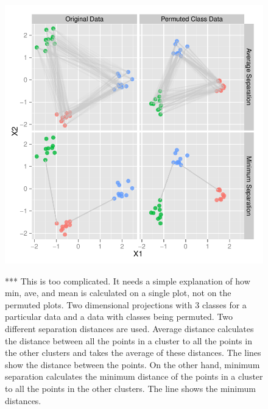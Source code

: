 \documentclass[12]{article}
\newcommand{\red}[1]{{\color{red} #1}}
\begin{document}
\begin{figure}[hbtp]
\centering
\includegraphics[scale=0.75]{ave-min-sep.pdf}
\label{sep-dist}
	\vspace{-.1in}
\caption{\red{*** This is too complicated. It needs a simple explanation of how min, ave, and mean is calculated on a single plot, not on the permuted plots.} Two dimensional projections with 3 classes for a particular data and a data with classes being permuted. Two different separation distances are used. Average distance calculates the distance between all the points in a cluster to all the points in the other clusters and takes the average of these distances. The lines show the distance between the points.  On the other hand,  minimum separation calculates the minimum distance of the points in a cluster to all the points in the other clusters. The line shows the minimum distances.  }
\end{figure}
\end{document}

